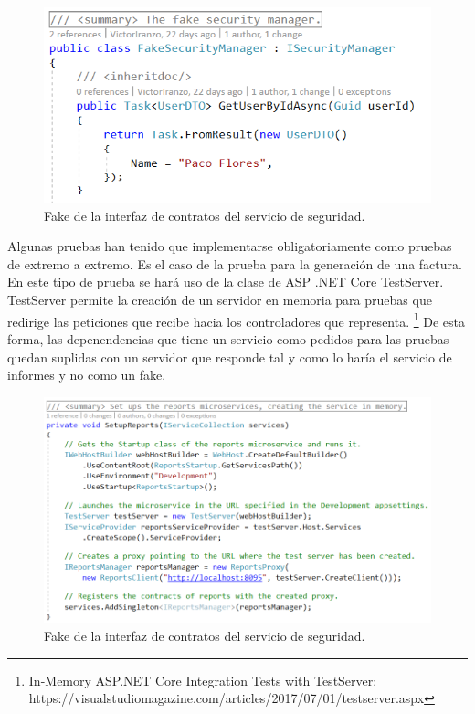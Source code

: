 \documentclass[11pt,spanish,listoffigures]{tfgetsinf}
\begin{document}
\begin{figure}[h]
\centering
\includegraphics[scale=0.8]{FakeSecurityManager}
\caption{Fake de la interfaz de contratos del servicio de seguridad.}
\end{figure}

Algunas pruebas han tenido que implementarse obligatoriamente como pruebas de extremo a extremo. Es el caso de la prueba para la generación de una factura. En este tipo de prueba se hará uso de la clase de ASP .NET Core TestServer. TestServer permite la creación de un servidor en memoria para pruebas que redirige las peticiones que recibe hacia los controladores que representa. \footnote{ In-Memory ASP.NET Core Integration Tests with TestServer: https://visualstudiomagazine.com/articles/2017/07/01/testserver.aspx} De esta forma, las depenendencias que tiene un servicio como pedidos para las pruebas quedan suplidas con un servidor que responde tal y como lo haría el servicio de informes y no como un fake.

\begin{figure}[h]
\centering
\includegraphics[scale=0.7]{TestServer}
\caption{Fake de la interfaz de contratos del servicio de seguridad.}
\end{figure}
\end{document}
